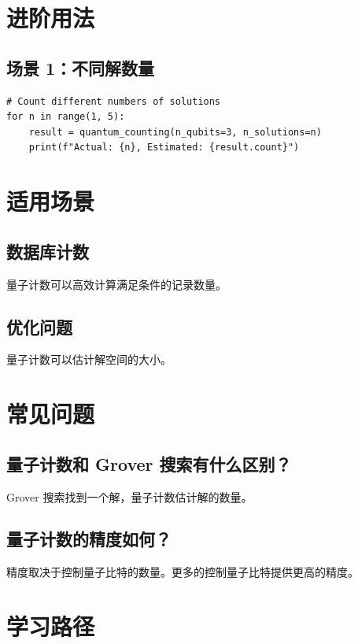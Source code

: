 \documentclass[12pt,a4paper]{article}
\begin{document}
\section{进阶用法}

\subsection{场景 1：不同解数量}

\begin{lstlisting}[style=python]
# Count different numbers of solutions
for n in range(1, 5):
    result = quantum_counting(n_qubits=3, n_solutions=n)
    print(f"Actual: {n}, Estimated: {result.count}")
\end{lstlisting}

\section{适用场景}

\subsection{数据库计数}

量子计数可以高效计算满足条件的记录数量。

\subsection{优化问题}

量子计数可以估计解空间的大小。

\section{常见问题}

\subsection{量子计数和 Grover 搜索有什么区别？}

Grover 搜索找到一个解，量子计数估计解的数量。

\subsection{量子计数的精度如何？}

精度取决于控制量子比特的数量。更多的控制量子比特提供更高的精度。

\section{学习路径}
\end{document}

